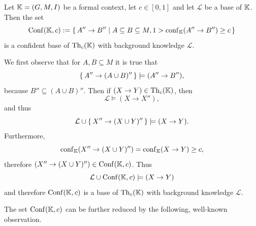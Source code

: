 \begin{Lemma}
  \label{lem:confident-base-of-formal-context}
  Let ${\mathbb{K}} = (G, M, I)$ be a formal context, let $c \in [0,1]$ and let $\mathcal{L}$ be
  a base of ${\mathbb{K}}$.  Then the set
  \begin{equation*}
    \operatorname{Conf}({\mathbb{K}}, c) := {\{\, A'' \to B'' \mid A \subseteq B \subseteq M, 1 > \operatorname{conf}_{{\mathbb{K}}}(A'' \to B'') \ge c\,\}}
  \end{equation*}
  is a confident base of $\operatorname{Th}_c({\mathbb{K}})$ with background knowledge $\mathcal{L}$.
\end{Lemma}
\begin{Proof}
  We first observe that for $A, B \subseteq M$ it is true that
  \begin{equation*}
    {\ensuremath{\{\, A'' \to (A \cup B)'' \,\}}} \models (A'' \to B''),
  \end{equation*}
  because $B'' \subseteq (A \cup B)''$.  Then if $(X \to Y) \in \operatorname{Th}_c({\mathbb{K}})$, then
  \begin{equation*}
    \mathcal{L} \models (X \to X''),
  \end{equation*}
  and thus
  \begin{equation*}
    \mathcal{L} \cup {\ensuremath{\{\, X'' \to (X \cup Y)''\,\}}} \models (X \to Y).
  \end{equation*}
  Furthermore,
  \begin{equation*}
    \operatorname{conf}_{{\mathbb{K}}}(X'' \to (X \cup Y)'') = \operatorname{conf}_{{\mathbb{K}}}(X \to Y) \ge c,
  \end{equation*}
  therefore $(X'' \to (X \cup Y)'') \in \operatorname{Conf}({\mathbb{K}}, c)$.  Thus
  \begin{equation*}
    \mathcal{L} \cup \operatorname{Conf}({\mathbb{K}}, c) \models (X \to Y)
  \end{equation*}
  and therefore $\operatorname{Conf}({\mathbb{K}}, c)$ is a base of $\operatorname{Th}_c({\mathbb{K}})$ with background knowledge
  $\mathcal{L}$.
\end{Proof}

The set $\operatorname{Conf}({\mathbb{K}}, c)$ can be further reduced by the following, well-known
observation.

